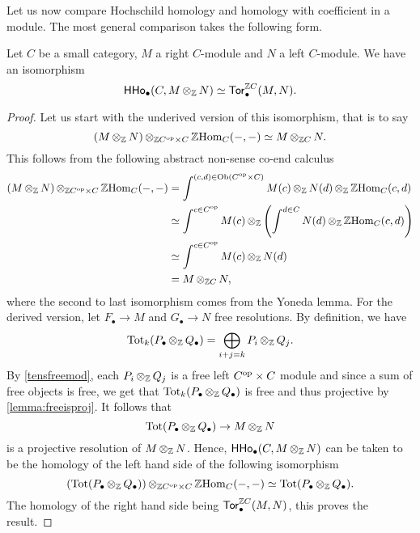 \documentclass{amsart}
\newcommand{\HHo}{\mathsf{HHo}}
\newcommand{\Tot}{\mathrm{Tot}}
\renewcommand{\homset}[3]{\mathrm{Hom}_{#1}(#2,#3)}
\begin{document}
Let us now compare Hochschild homology and homology with coefficient in
a module. The most general comparison takes the following form.
\begin{proposition}
  Let $C$ be a small category, $M$ a right $C$\nbd-module and $N$ a
  left $C$\nbd-module. We have an isomorphism
  \[
    \HHo_{\bullet}(C,M\tens_{\Z}N)\simeq \Tor{\Z C}{\bullet}(M,N).
  \]
\end{proposition}
\begin{proof}
  Let us start with the underived version of this isomorphism, that is
  to say
  \[
    (M\tens_{\Z}N)\tens_{\Z C^{\op}\times C}\Z\homset{C}{-}{-} \simeq M\tens_{\Z C} N.
  \]
  This follows from the following abstract non-sense co-end calculus
  \[
    \begin{aligned}
     (M\tens_{\Z}N)\tens_{\Z C^{\op}\times C}\Z\homset{C}{-}{-} &=
                                                                \int^{(c,d)\in
                                                                \Ob(C^{\op}\times
                                                                C)}M(c)\tens_{\Z}N(d)\tens_{\Z}\Z\homset{C}{c}{d}\\ 
      &\simeq\int^{c \in C^{\op}}M(c)\tens_{\Z}\left(\int^{d \in
        C}N(d)\tens_{\Z}\Z\homset{C}{c}{d}\right)\\
                                                              &\simeq\int^{c\in C^{\op}}M(c)\tens_{\Z}N(d)\\
      &=M\tens_{\Z C}N,
    \end{aligned}
  \]
  where the second to last isomorphism comes from the Yoneda
  lemma. For the derived version, let $F_{\bullet} \to M$ and
  $G_{\bullet} \to N$ free resolutions. By definition, we have
  \[
    \Tot_k(P_{\bullet}\tens_{\Z}Q_{\bullet})=\bigoplus_{i+j=k}P_i\tens_{\Z}Q_j.
  \]
  By \cref{tensfreemod}, each $P_i\operatorname{\otimes}_{\mathbb Z}Q_j$ is a free left
  $C^{{\mathrm{op}}}\times C$ module and since a sum of free objects is
  free, we get that
  $\Tot_k(P_{\bullet}\tens_{\Z}Q_{\bullet})$ is free and thus
  projective by \cref{lemma:freeisproj}. It follows that
  \[
    \Tot(P_{\bullet}\tens_{\Z}Q_{\bullet}) \to M\tens_{\Z}N
  \]
  is a projective resolution of $M\operatorname{\otimes}_{\mathbb Z}N$. Hence,
  $\HHo_{\bullet}(C,M\tens_{\Z}N)$ can be taken to be the homology of
  the left hand side of the following isomorphism
  \[
    \left(\Tot(P_{\bullet}\tens_{\Z}Q_{\bullet})\right)\tens_{\Z C^{\op}\times C}\Z
    \homset{C}{-}{-}\simeq \Tot(P_{\bullet}\tens_{\Z}Q_{\bullet}).
  \]
  The homology of the right hand side being $\mathsf{Tor}^{\mathbb Z C}_{\bullet}(M,N)$,
  this proves the result.
\end{proof}
\end{document}
